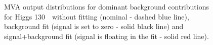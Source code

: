\begin{figure}[!hbtp]
\caption{
MVA output distributions for dominant background contributions for
Higgs 130~\GeV\ without fitting (nominal - dashed blue line),
background fit (signal is set to zero - solid black line) and
signal+background fit (signal is floating in the fit - solid red
line).}
\label{fig:bdt2_130}
\end{figure}


